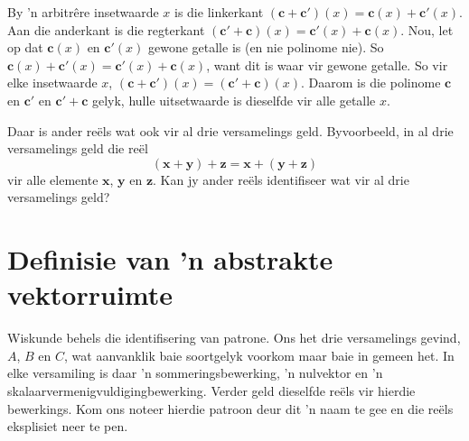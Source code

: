 \documentclass[a4paper,11pt]{book}
\theoremstyle{definition}
\newcommand{\be}{\begin{equation}}
\newcommand{\ee}{\end{equation}}
\newcommand{\ve}[1]{\mathbf{#1}}
\begin{document}
By 'n arbitr{\^e}re insetwaarde $x$ is die linkerkant $(\ve{c} +
\ve{c}')(x) = \ve{c}(x) + \ve{c}'(x)$.  Aan die anderkant is die regterkant
$(\ve{c}' + \ve{c})(x) = \ve{c}'(x) + \ve{c}(x)$. Nou, let op dat
$\ve{c}(x)$ en $\ve{c}'(x)$ gewone getalle is (en nie polinome nie).  So
$\ve{c}(x) + \ve{c}'(x) = \ve{c}'(x) + \ve{c}(x)$, want dit is waar vir
gewone getalle. So vir elke insetwaarde $x$, $(\ve{c} + \ve{c}') (x) =
(\ve{c}' + \ve{c})(x)$.  Daarom is die polinome $\ve{c}$ en $\ve{c}'$ en
$\ve{c}' + \ve{c}$ gelyk, hulle uitsetwaarde is dieselfde vir alle getalle
$x$.

Daar is ander re{\"e}ls wat ook vir al drie versamelings geld.
Byvoorbeeld, in al drie versamelings geld die re{\"e}l
\be
(\ve{x} + \ve{y}) + \ve{z} = \ve{x} + (\ve{y} + \ve{z})
\ee
vir alle elemente $\ve{x}$, $\ve{y}$ en $\ve{z}$. Kan jy ander re{\"e}ls
identifiseer wat vir al drie versamelings geld?

\section{Definisie van 'n abstrakte vektorruimte}  \label{ACh1Sec2DefVectorSpace}
Wiskunde behels die identifisering van patrone. Ons het drie versamelings
gevind, $A$, $B$ en $C$, wat aanvanklik baie soortgelyk voorkom maar baie
in gemeen het. In elke versamiling is daar 'n sommeringsbewerking, 'n
nulvektor en 'n skalaarvermenigvuldigingbewerking. Verder geld dieselfde
re{\"e}ls vir hierdie bewerkings. Kom ons noteer hierdie patroon deur dit
'n naam te gee en die re{\"e}ls eksplisiet neer te pen.
\end{document}
